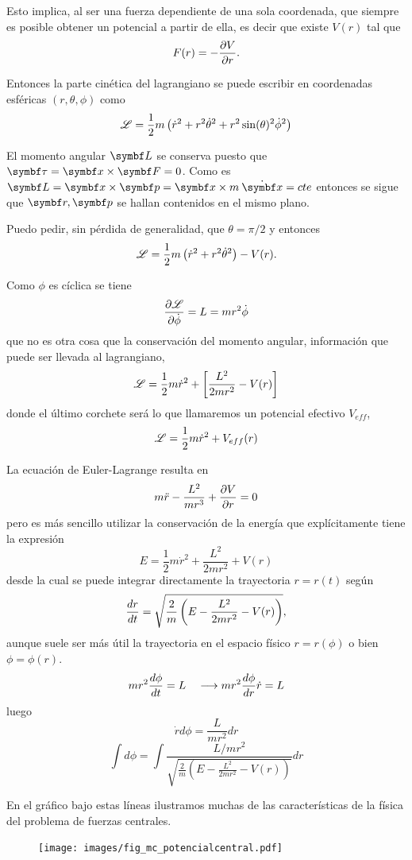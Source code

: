 \documentclass[10pt,oneside]{CBFT_book}
\begin{document}
Esto implica, al ser una fuerza dependiente de una sola coordenada, que siempre es posible obtener un potencial
a partir de ella, es decir que existe $V(r)$ tal que
\[
	F(r) = - \frac{\partial^{\hspace{-0.05em}} {V}}{\partial {r}^{\hspace{-0.05em}}}.
\]

Entonces la parte cinética del lagrangiano se puede escribir en coordenadas esféricas $(r,\theta,\phi)$ como
\[
	\mathscr{L} = \frac{1}{2}m \left( \dot{r}^2 + r^2 \dot{\theta}^2 + r^2 \sin(\theta)^2\dot{\phi}^2 \right)
\]

El momento angular $\vb{L}$ se conserva puesto que $\vb{\tau} = \vb{x} \times \vb{F}=0$. Como es 
$\vb{L} = \vb{x} \times \vb{p} = \vb{x} \times m \: \dot{\vb{x}} = cte$ entonces se sigue que $\vb{r},\vb{p}$
se hallan contenidos en el mismo plano.

Puedo pedir, sin pérdida de generalidad, que $\theta=\pi/2$ y entonces 
\[
	\mathscr{L} = \frac{1}{2}m \left( \dot{r}^2 + r^2 \dot{\theta}^2 \right) - V(r).
\]

Como $\phi$ es cíclica se tiene
\[
	\frac{\partial^{\hspace{-0.05em}} {\mathscr{L}}}{\partial {\dot{\phi}}^{\hspace{-0.05em}}} = L = mr^2\dot{\phi}
\]
que no es otra cosa que la conservación del momento angular, información que puede ser llevada al
lagrangiano,
\[
	\mathscr{L} = \frac{1}{2}m \dot{r}^2 + \left[ \frac{L^2}{2 m r^2} - V(r) \right]
\]
donde el último corchete será lo que llamaremos un potencial efectivo $V_{eff}$,
\[
	\mathscr{L} = \frac{1}{2}m \dot{r}^2 + V_{eff}(r)
\]

La ecuación de Euler-Lagrange resulta en
\[
	m\ddot{r} - \frac{L^2}{mr^3} + \frac{\partial^{\hspace{-0.05em}} {V}}{\partial {r}^{\hspace{-0.05em}}} = 0
\]
pero es más sencillo utilizar la conservación de la energía que explícitamente tiene la expresión
\[
	E = \frac{1}{2}m \dot{r}^2 + \frac{L^2}{2 m r^2} + V(r)
\]
desde la cual se puede integrar directamente la trayectoria $r=r(t)$ según
\[
	\frac{d^{\hspace{-0.05em}} {r}}{d {t}^{\hspace{-0.05em}}} = \sqrt{ \frac{2}{m}\left( E - \frac{L^2}{2 m r^2} - V(r) \right)},
\]
aunque suele ser más útil la trayectoria en el espacio físico $r=r(\phi)$ o bien $\phi=\phi(r)$.
\[
	m r^2 \frac{d^{\hspace{-0.05em}} {\phi}}{d {t}^{\hspace{-0.05em}}} = L \quad \longrightarrow m r^2 \frac{d^{\hspace{-0.05em}} {\phi}}{d {r}^{\hspace{-0.05em}}} \dot{r} = L
\]
luego
\[
	\dot{r} d\phi = \frac{L}{m r^2} dr
\]
\[
	\int d\phi = \int \frac{L/mr^2}{\sqrt{ \frac{2}{m}\left( E - \frac{L^2}{2 m r^2} - V(r) \right)}}dr
\]

En el gráfico bajo estas líneas ilustramos muchas de las características de la física del problema
de fuerzas centrales.

\begin{figure}[hbt]
	\begin{center}
	\texttt{[image: images/fig\_mc\_potencialcentral.pdf]}	 
	\end{center}
	\caption{}
\end{figure} 
\end{document}
